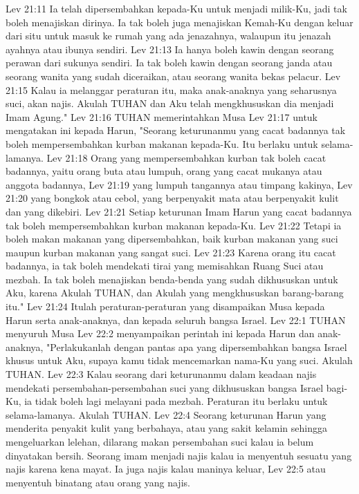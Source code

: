 Lev 21:11  Ia telah dipersembahkan kepada-Ku untuk menjadi milik-Ku, jadi tak boleh menajiskan dirinya. Ia tak boleh juga menajiskan Kemah-Ku dengan keluar dari situ untuk masuk ke rumah yang ada jenazahnya, walaupun itu jenazah ayahnya atau ibunya sendiri.
Lev 21:13  Ia hanya boleh kawin dengan seorang perawan dari sukunya sendiri. Ia tak boleh kawin dengan seorang janda atau seorang wanita yang sudah diceraikan, atau seorang wanita bekas pelacur.
Lev 21:15  Kalau ia melanggar peraturan itu, maka anak-anaknya yang seharusnya suci, akan najis. Akulah TUHAN dan Aku telah mengkhususkan dia menjadi Imam Agung."
Lev 21:16  TUHAN memerintahkan Musa
Lev 21:17  untuk mengatakan ini kepada Harun, "Seorang keturunanmu yang cacat badannya tak boleh mempersembahkan kurban makanan kepada-Ku. Itu berlaku untuk selama-lamanya.
Lev 21:18  Orang yang mempersembahkan kurban tak boleh cacat badannya, yaitu orang buta atau lumpuh, orang yang cacat mukanya atau anggota badannya,
Lev 21:19  yang lumpuh tangannya atau timpang kakinya,
Lev 21:20  yang bongkok atau cebol, yang berpenyakit mata atau berpenyakit kulit dan yang dikebiri.
Lev 21:21  Setiap keturunan Imam Harun yang cacat badannya tak boleh mempersembahkan kurban makanan kepada-Ku.
Lev 21:22  Tetapi ia boleh makan makanan yang dipersembahkan, baik kurban makanan yang suci maupun kurban makanan yang sangat suci.
Lev 21:23  Karena orang itu cacat badannya, ia tak boleh mendekati tirai yang memisahkan Ruang Suci atau mezbah. Ia tak boleh menajiskan benda-benda yang sudah dikhususkan untuk Aku, karena Akulah TUHAN, dan Akulah yang mengkhususkan barang-barang itu."
Lev 21:24  Itulah peraturan-peraturan yang disampaikan Musa kepada Harun serta anak-anaknya, dan kepada seluruh bangsa Israel.
Lev 22:1  TUHAN menyuruh Musa
Lev 22:2  menyampaikan perintah ini kepada Harun dan anak-anaknya, "Perlakukanlah dengan pantas apa yang dipersembahkan bangsa Israel khusus untuk Aku, supaya kamu tidak mencemarkan nama-Ku yang suci. Akulah TUHAN.
Lev 22:3  Kalau seorang dari keturunanmu dalam keadaan najis mendekati persembahan-persembahan suci yang dikhususkan bangsa Israel bagi-Ku, ia tidak boleh lagi melayani pada mezbah. Peraturan itu berlaku untuk selama-lamanya. Akulah TUHAN.
Lev 22:4  Seorang keturunan Harun yang menderita penyakit kulit yang berbahaya, atau yang sakit kelamin sehingga mengeluarkan lelehan, dilarang makan persembahan suci kalau ia belum dinyatakan bersih. Seorang imam menjadi najis kalau ia menyentuh sesuatu yang najis karena kena mayat. Ia juga najis kalau maninya keluar,
Lev 22:5  atau menyentuh binatang atau orang yang najis.
